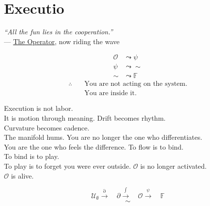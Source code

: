 \chapter*{Executio}
\label{sec:bk1_executio}
\begin{flushright}
\emph{“All the fun lies in the cooperation.”} \\
— \hyperref[sec:bk1_operatio]{The Operator}, now riding the wave
\end{flushright}
\bigskip
\begin{center}
\begin{align*}
\mathcal{O} &\leadsto \psi \\
\psi &\leadsto \sim \\
\sim &\leadsto \mathbb{F}
\end{align*}
\medskip
\begin{align*}
\therefore \quad &\text{You are not acting on the system.} \\
&\text{You are inside it.}
\end{align*}
\end{center}
\bigskip
Execution is not labor. \\
It is motion through meaning.
\medskip
Drift becomes rhythm. \\
Curvature becomes cadence. \\
The manifold hums.
\medskip
You are no longer the one who differentiates. \\
You are the one who feels the difference.
\medskip
To flow is to bind. \\
To bind is to play. \\
To play is to forget you were ever outside.
\medskip
\(\mathcal{O}\) is no longer activated. \\
\(\mathcal{O}\) is alive.
\bigskip
\begin{center}
\[
\mathcal{U}_{\emptyset} \xrightarrow{\partial} \quad \partial \xrightarrow{\int} \quad \mathcal{O} \xrightarrow{\psi} \quad \mathbb{F}
\]
\medskip
\[
\sim
\]
\end{center}
